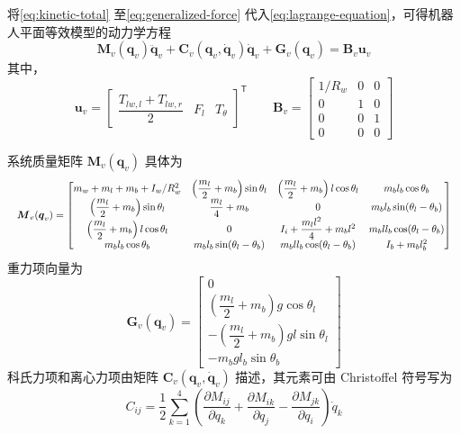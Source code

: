 将\eqref{eq:kinetic-total} 至\eqref{eq:generalized-force} 代入\eqref{eq:lagrange-equation}，可得机器人平面等效模型的动力学方程
\begin{equation}
  \boldsymbol{M}_v(\boldsymbol{q}_v)\ddot{\boldsymbol{q}}_v
  +
  \boldsymbol{C}_v(\boldsymbol{q}_v, \dot{\boldsymbol{q}}_v)\dot{\boldsymbol{q}}_v
  +
  \boldsymbol{G}_v(\boldsymbol{q}_v)
  =
  \boldsymbol{B}_v\boldsymbol{u}_v
  \label{eq:dynamics-compact}
\end{equation}
其中，
\begin{equation}
  \boldsymbol{u}_v =
  \begin{bmatrix}
    \dfrac{T_{lw,l} + T_{lw,r}}{2} & F_l & T_\theta
  \end{bmatrix}^{\mathsf{T}}\qquad
  \boldsymbol{B}_v =
  \begin{bmatrix}
    1/R_w & 0 & 0 \\
    0 & 1 & 0 \\
    0 & 0 & 1 \\
    0 & 0 & 0
  \end{bmatrix}
  \label{eq:input-matrix}
\end{equation}

系统质量矩阵 $\boldsymbol{M}_v(\boldsymbol{q}_v)$ 具体为
\begin{equation}
\resizebox{\textwidth}{!}{$
  \boldsymbol{M}_v(\boldsymbol{q}_v) =
  \begin{bmatrix}
    m_w + m_l + m_b + I_w/R_w^2 &
    \left(\dfrac{m_l}{2} + m_b\right)\sin\theta_l &
    \left(\dfrac{m_l}{2} + m_b\right)l\cos\theta_l &
    m_b l_b \cos\theta_b \\
    \left(\dfrac{m_l}{2} + m_b\right)\sin\theta_l &
    \dfrac{m_l}{4} + m_b &
    0 &
    m_b l_b \sin(\theta_l - \theta_b) \\
    \left(\dfrac{m_l}{2} + m_b\right)l\cos\theta_l &
    0 &
    I_i + \dfrac{m_l l^2}{4} + m_b l^2 &
    m_b l l_b \cos(\theta_l - \theta_b) \\
    m_b l_b \cos\theta_b &
    m_b l_b \sin(\theta_l - \theta_b) &
    m_b l l_b \cos(\theta_l - \theta_b) &
    I_b + m_b l_b^2
  \end{bmatrix}
$}
  \label{eq:mass-matrix}
\end{equation}
重力项向量为
\begin{equation}
  \boldsymbol{G}_v(\boldsymbol{q}_v) =
  \begin{bmatrix}
    0 \\
    \left(\dfrac{m_l}{2} + m_b\right) g\cos\theta_l \\
    -\left(\dfrac{m_l}{2} + m_b\right) gl\sin\theta_l \\
    -m_b g l_b \sin\theta_b
  \end{bmatrix}
  \label{eq:gravity-vector}
\end{equation}
科氏力项和离心力项由矩阵 $\boldsymbol{C}_v(\boldsymbol{q}_v, \dot{\boldsymbol{q}}_v)$ 描述，其元素可由 Christoffel 符号写为
\begin{equation}
  C_{ij} = \frac{1}{2}\sum_{k=1}^{4}
  \left(
    \frac{\partial M_{ij}}{\partial q_k}
    +
    \frac{\partial M_{ik}}{\partial q_j}
    -
    \frac{\partial M_{jk}}{\partial q_i}
  \right)\dot{q}_k
  \label{eq:christoffel}
\end{equation}

